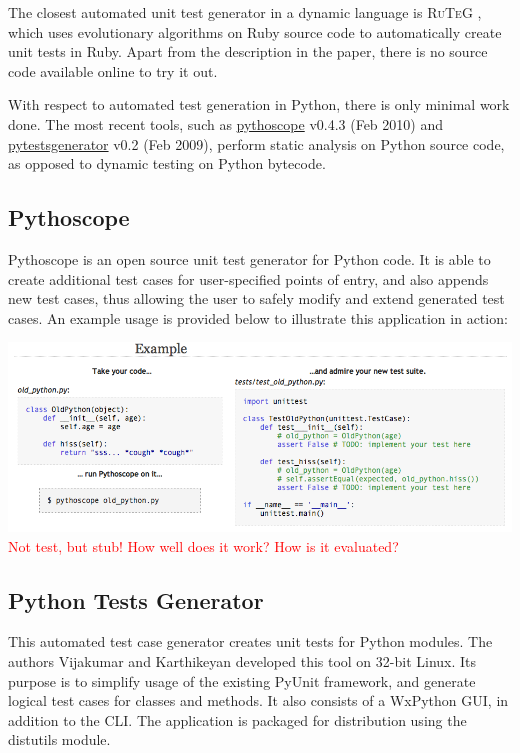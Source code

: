 \documentclass{icldt}
\numberwithin{equation}{section}       %
\begin{document}
The closest automated unit test generator in a dynamic language is \textsc{RuTeG} \cite{Mairhofer2011}, which uses evolutionary algorithms on Ruby source code to automatically create unit tests in Ruby. Apart from the description in the paper, there is no source code available online to try it out.

With respect to automated test generation in Python, there is only minimal work done. The most recent tools, such as \href{http://pythoscope.org/tutorial}{\textsf{pythoscope}} v0.4.3 (Feb 2010) and \href{http://code.google.com/p/pytestsgenerator}{\textsf{pytestsgenerator}} v0.2 (Feb 2009), perform static analysis on Python source code, as opposed to dynamic testing on Python bytecode.

\subsection{Pythoscope}
Pythoscope is an open source unit test generator for Python code. It is able to create additional test cases for user-specified points of entry, and also appends new test cases, thus allowing the user to safely modify and extend generated test cases. An example usage is provided below to illustrate this application in action:

\includegraphics[scale=.46]{pythoscope.png}
\textcolor{red}{Not test, but stub! How well does it work? How is it evaluated?}
\subsection{Python Tests Generator}
This automated test case generator creates unit tests for Python modules. The authors Vijakumar and Karthikeyan developed this tool on 32-bit Linux. Its purpose is to simplify usage of the existing PyUnit framework, and generate logical test cases for classes and methods. It also consists of a WxPython GUI, in addition to the CLI. The application is packaged for distribution using the \textsf{distutils} module.
\end{document}
